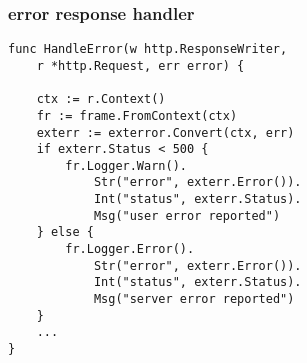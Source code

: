 \documentclass{beamer}
\begin{document}
\begin{frame}[fragile]
\frametitle{error response handler}
\begin{lstlisting}[basicstyle=\ttfamily\footnotesize]
func HandleError(w http.ResponseWriter,
	r *http.Request, err error) {

	ctx := r.Context()
	fr := frame.FromContext(ctx)
	exterr := exterror.Convert(ctx, err)
	if exterr.Status < 500 {
		fr.Logger.Warn().
			Str("error", exterr.Error()).
			Int("status", exterr.Status).
			Msg("user error reported")
	} else {
		fr.Logger.Error().
			Str("error", exterr.Error()).
			Int("status", exterr.Status).
			Msg("server error reported")
	}
	...
}
\end{lstlisting}
\end{frame}
\end{document}
